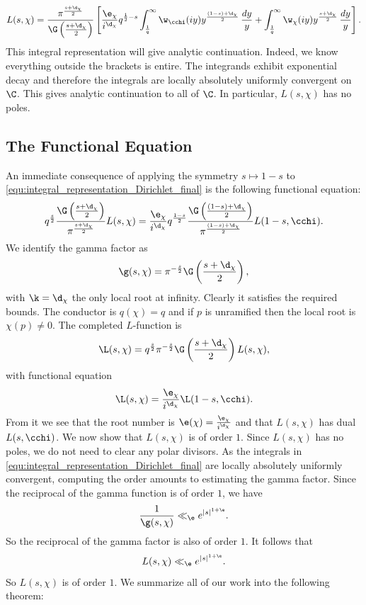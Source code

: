       \begin{equation}\label{equ:integral_representation_Dirichlet_final}
        L(s,\chi) = \frac{\pi^{\frac{s+\d_{\chi}}{2}}}{\G\left(\frac{s+\d_{\chi}}{2}\right)}\left[\frac{\e_{\chi}}{i^{\d_{\chi}}}q^{\frac{1}{2}-s}\int_{\frac{1}{q}}^{\infty}\w_{\cchi}(iy)y^{\frac{(1-s)+\d_{\chi}}{2}}\,\frac{dy}{y}+\int_{\frac{1}{q}}^{\infty}\w_{\chi}(iy)y^{\frac{s+\d_{\chi}}{2}}\,\frac{dy}{y}\right].
      \end{equation}
      This integral representation will give analytic continuation. Indeed, we know everything outside the brackets is entire. The integrands exhibit exponential decay and therefore the integrals are locally absolutely uniformly convergent on \(\C\). This gives analytic continuation to all of \(\C\). In particular, \(L(s,\chi)\) has no poles.
    \subsection*{The Functional Equation}
      An immediate consequence of applying the symmetry \(s \mapsto 1-s\) to \cref{equ:integral_representation_Dirichlet_final} is the following functional equation:
      \[
        q^{\frac{s}{2}}\frac{\G\left(\frac{s+\d_{\chi}}{2}\right)}{\pi^{\frac{s+\d_{\chi}}{2}}}L(s,\chi) = \frac{\e_{\chi}}{i^{\d_{\chi}}}q^{\frac{1-s}{2}}\frac{\G\left(\frac{(1-s)+\d_{\chi}}{2}\right)}{\pi^{\frac{(1-s)+\d_{\chi}}{2}}}L(1-s,\cchi).
      \]
      We identify the gamma factor as
      \[
        \g(s,\chi) = \pi^{-\frac{s}{2}}\G\left(\frac{s+\d_{\chi}}{2}\right),
      \]
      with \(\k = \d_{\chi}\) the only local root at infinity. Clearly it satisfies the required bounds. The conductor is \(q(\chi) = q\) and if \(p\) is unramified then the local root is \(\chi(p) \neq 0\). The completed \(L\)-function is
      \[
        \L(s,\chi) = q^{\frac{s}{2}}\pi^{-\frac{s}{2}}\G\left(\frac{s+\d_{\chi}}{2}\right)L(s,\chi),
      \]
      with functional equation
      \[
        \L(s,\chi) = \frac{\e_{\chi}}{i^{\d_{\chi}}}\L(1-s,\cchi).
      \]
      From it we see that the root number is \(\e(\chi) = \frac{\e_{\chi}}{i^{\d_{\chi}}}\) and that \(L(s,\chi)\) has dual \(L(s,\cchi)\). We now show that \(L(s,\chi)\) is of order \(1\). Since \(L(s,\chi)\) has no poles, we do not need to clear any polar divisors. As the integrals in \cref{equ:integral_representation_Dirichlet_final} are locally absolutely uniformly convergent, computing the order amounts to estimating the gamma factor. Since the reciprocal of the gamma function is of order \(1\), we have
      \[
        \frac{1}{\g(s,\chi)} \ll_{\e} e^{|s|^{1+\e}}.
      \]
      So the reciprocal of the gamma factor is also of order \(1\). It follows that
      \[
        L(s,\chi) \ll_{\e} e^{|s|^{1+\e}}.
      \]
      So \(L(s,\chi)\) is of order \(1\). We summarize all of our work into the following theorem:

